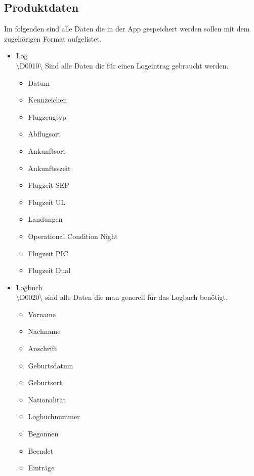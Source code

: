 \documentclass[a4paper]{article} %
\begin{document}
    \subsection{Produktdaten}
    \vspace{1cm}
    Im folgenden sind alle Daten die in der App gespeichert werden sollen mit dem zugehörigen Format aufgelistet.
    \vspace{0.5cm}
    \begin{itemize}
        \item Log\\
        \textbackslash D0010\textbackslash{} Sind alle Daten die für einen Logeintrag gebraucht werden.
        \begin{itemize}
            \item Datum
            \item Kennzeichen
            \item Flugzeugtyp
            \item Abflugsort
            \item Ankunftsort
            \item Ankunftsszeit
            \item Flugzeit SEP
            \item Flugzeit UL
            \item Landungen
            \item Operational Condition Night
            \item Flugzeit PIC
            \item Flugzeit Dual
        \end{itemize}
        \item Logbuch\\
        \textbackslash D0020\textbackslash{} sind alle Daten die man generell für das Logbuch benötigt.
        \begin{itemize}
            \item Vorname
            \item Nachname
            \item Anschrift
            \item Geburtsdatum
            \item Geburtsort
            \item Nationalität
            \item Logbuchnummer
            \item Begonnen
            \item Beendet
            \item Einträge
        \end{itemize}\\


\end{itemize}
\end{document}
